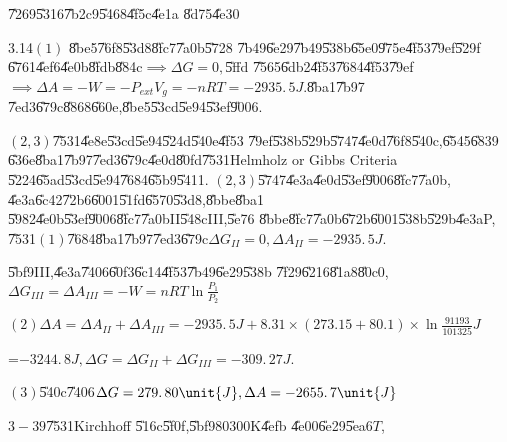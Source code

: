 \documentclass{article}
\begin{document}
\bigskip \bigskip \U{7269}\U{5316}\U{7b2c}9\U{5468}\U{4f5c}\U{4e1a}\qquad 
\U{8d75}\U{4e30}

3.14$\left( 1\right) $ \U{8be5}\U{76f8}\U{53d8}\U{8fc7}\U{7a0b}\U{5728}%
\U{7b49}\U{6e29}\U{7b49}\U{538b}\U{65e0}\U{975e}\U{4f53}\U{79ef}\U{529f}%
\U{6761}\U{4ef6}\U{4e0b}\U{8fdb}\U{884c}$\implies \Delta G=0,$\U{5ffd}%
\U{7565}\U{6db2}\U{4f53}\U{7684}\U{4f53}\U{79ef}$\implies \Delta
A=-W=-P_{ext}V_{g}=-nRT=-2935.\,\allowbreak 5\unit{J}.$\U{8ba1}\U{7b97}%
\U{7ed3}\U{679c}\U{8868}\U{660e},\U{8be5}\U{53cd}\U{5e94}\U{53ef}\U{9006}.

$\left( 2,3\right) $\U{7531}\U{4e8e}\U{53cd}\U{5e94}\U{524d}\U{540e}\U{4f53}%
\U{79ef}\U{538b}\U{529b}\U{5747}\U{4e0d}\U{76f8}\U{540c},\U{6545}\U{6839}%
\U{636e}\U{8ba1}\U{7b97}\U{7ed3}\U{679c}\U{4e0d}\U{80fd}\U{7531}Helmholz or
Gibbs Criteria \U{5224}\U{65ad}\U{53cd}\U{5e94}\U{7684}\U{65b9}\U{5411}. $%
\left( 2,3\right) $\U{5747}\U{4e3a}\U{4e0d}\U{53ef}\U{9006}\U{8fc7}\U{7a0b},%
\U{4e3a}\U{6c42}\U{72b6}\U{6001}\U{51fd}\U{6570}\U{53d8},\U{8bbe}\U{8ba1}%
\U{5982}\U{4e0b}\U{53ef}\U{9006}\U{8fc7}\U{7a0b}II\U{548c}III,\U{5e76}%
\U{8bbe}\U{8fc7}\U{7a0b}\U{672b}\U{6001}\U{538b}\U{529b}\U{4e3a}P, \U{7531}$%
\left( 1\right) $\U{7684}\U{8ba1}\U{7b97}\U{7ed3}\U{679c}$\Delta
G_{II}=0,\Delta A_{II}=-2935.\,\allowbreak 5\unit{J}.$


\U{5bf9}III,\U{4e3a}\U{7406}\U{60f3}\U{6c14}\U{4f53}\U{7b49}\U{6e29}\U{538b}%
\U{7f29}\U{6216}\U{81a8}\U{80c0},$\Delta G_{III}=\Delta A_{III}=-W=nRT\ln 
\frac{P_{1}}{P_{2}}$

$\left( 2\right) \Delta A=\Delta A_{II}+\Delta A_{III}=-2935.\,5\unit{J}%
+8.31\times \left( 273.15+80.1\right) \times \ln \frac{91193}{101325}\unit{J}
$

=$-3244.\,\allowbreak 8\unit{J},\Delta G=\Delta G_{II}+\Delta
G_{III}=-309.\,\allowbreak 27\unit{J}.$

$\left( 3\right) $\U{540c}\U{7406}$\allowbreak \Delta G=\allowbreak
279.\,\allowbreak 80\unit{J},\Delta A=\allowbreak -2655.\,\allowbreak 7\unit{%
J}$

$3-39$\U{7531}Kirchhoff \U{516c}\U{5f0f},\U{5bf9}80300K\U{4efb}%
\U{4e00}\U{6e29}\U{5ea6}$T$,
\end{document}
